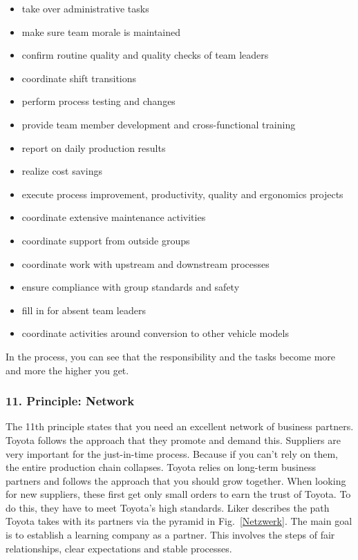 \documentclass[a4paper,11pt]{article}
\begin{document}
\begin{itemize}
\begin{itemize}
  \item take over administrative tasks
  \item make sure team morale is maintained
  \item confirm routine quality and quality checks of team leaders
  \item coordinate shift transitions
  \item perform process testing and changes
  \item provide team member development and cross-functional training
  \item report on daily production results
  \item realize cost savings
  \item execute process improvement, productivity, quality and ergonomics
    projects
  \item coordinate extensive maintenance activities
  \item coordinate support from outside groups
  \item coordinate work with upstream and downstream processes
  \item ensure compliance with group standards and safety
  \item fill in for absent team leaders
  \item coordinate activities around conversion to other vehicle models
  \end{itemize}
\end{itemize}

In the process, you can see that the responsibility and the tasks become more
and more the higher you get.

\subsubsection*{11. Principle: Network}

The 11th principle states that you need an excellent network of business
partners. Toyota follows the approach that they promote and demand
this. Suppliers are very important for the just-in-time process. Because if
you can't rely on them, the entire production chain collapses. Toyota relies
on long-term business partners and follows the approach that you should grow
together. When looking for new suppliers, these first get only small orders to
earn the trust of Toyota. To do this, they have to meet Toyota's high
standards. Liker describes the path Toyota takes with its partners via the
pyramid in Fig.~\ref{Netzwerk}. The main goal is to establish a learning
company as a partner. This involves the steps of fair relationships, clear
expectations and stable processes.
\end{document}
